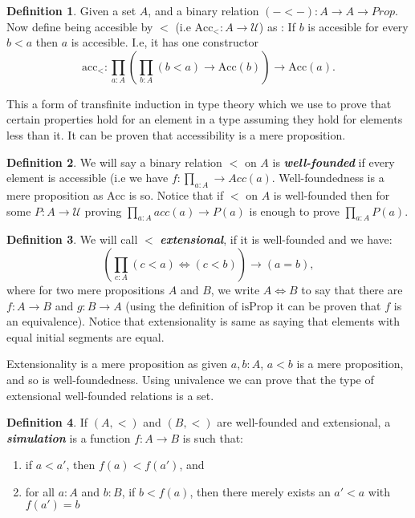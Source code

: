 \documentclass[10pt]{article}
\theoremstyle{definition}
\newtheorem{definition}{Definition}[section]
\theoremstyle{plain}
\theoremstyle{remark}
\newcommand{\U}{\mathscr{U}}
\begin{document}
\begin{definition}\label{D:Acc}
Given a set $A$, and a binary relation $(-<-) : A \to A \to Prop$. Now define being 
accesible by $<$ (i.e $\text{Acc}_{<} : A \to \U$) as : If $b$ is accesible for every $b<a$ 
then $a$ is accesible. I.e, it has one constructor 
\[ \text{acc}_< : \prod_{a : A} \left( \prod_{b : A} (b<a) \to \text{Acc}(b) \right) 
\to \text{Acc}(a). \]

\end{definition}
 
This a form of transfinite induction in type theory which we use to prove that certain
properties hold for an element in a type assuming they hold for elements less than it.
It can be proven that accessibility is a mere proposition. 

\begin{definition}\label{D:WF}
We will say a binary relation $<$ on $A$ is \textbf{\textit{well-founded}} if every element
is accessible (i.e we have $f : \prod_{a : A} \to Acc(a)$. Well-foundedness is a mere 
proposition as $\text{Acc}$ is so. Notice that if $<$ on $A$ is well-founded then for some 
$P : A \to \U$ proving $\prod_{a:A} acc(a) \to P(a)$ is enough to prove $\prod_{a : A} P(a)$.
\end{definition}

\begin{definition}\label{D:Ext}
We will call $<$ \textbf{\textit{extensional}}, if it is well-founded and we have:
\[ \left( \prod_{c : A}  (c<a) \iff (c<b) \right) \to (a = b),\]
where for two mere propositions $A$ and $B$, we write $A\iff B$ to say that there are 
$f : A \to B$ and $g : B \to A$ (using the definition of $\text{isProp}$ it can be proven 
that $f$ is an equivalence). Notice that extensionality is same as saying that elements 
with equal initial segments are equal.
\end{definition} 

Extensionality is a mere proposition as given $a,b:A$, $a<b$ is a mere proposition, and so
is well-foundedness. Using univalence we can prove that the type of extensional well-founded
relations is a set.

\begin{definition}\label{D:sim}
If $(A,<)$ and $(B,<)$ are well-founded and extensional, a \textbf{\textit{simulation}} is
a function $f : A \to B$ is such that:
\begin{enumerate}
\item if $a < a'$, then $f(a) < f(a')$, and
\item for all $a : A$ and $b : B$, if $b < f(a)$, then there merely exists an $a' < a$ with
      $f(a') = b$
\end{enumerate}
\end{definition} 
\end{document}
